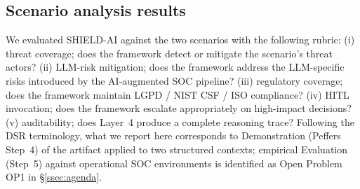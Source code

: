 \documentclass[preprint,12pt,authoryear]{elsarticle}
\begin{document}
\subsection{Scenario analysis results}
We evaluated SHIELD-AI against the two scenarios with the following rubric: (i) threat coverage; does the framework detect or mitigate the scenario's threat actors? (ii) LLM-risk mitigation; does the framework address the LLM-specific risks introduced by the AI-augmented SOC pipeline? (iii) regulatory coverage; does the framework maintain LGPD / NIST CSF / ISO compliance? (iv) HITL invocation; does the framework escalate appropriately on high-impact decisions? (v) auditability; does Layer~4 produce a complete reasoning trace? Following the DSR terminology, what we report here corresponds to Demonstration (Peffers Step~4) of the artifact applied to two structured contexts; empirical Evaluation (Step~5) against operational SOC environments is identified as Open Problem OP1 in §\ref{ssec:agenda}.

\begin{table}[ht]
\centering
\caption{Scenario evaluation matrix. Scores are author-assigned ordinal 1--5 ratings (1 = inadequate; 5 = strong) under the rubric of §\ref{sec:eval}; the protocol is pre-registered in this manuscript and authors take responsibility for the assignment. Per-criterion justifications appear in the prose below.}
\label{tab:scenarioscores}
\small
{}%
\end{table}
\end{document}
